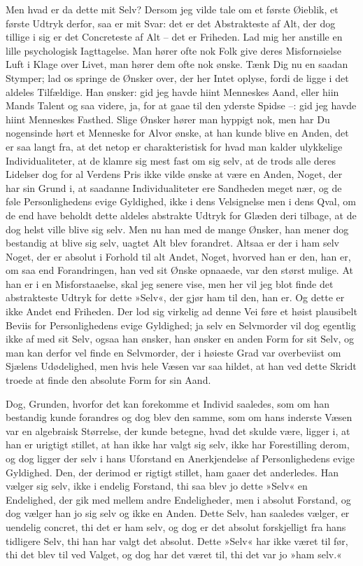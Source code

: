 \documentclass[12pt,a4paper]{article}
\begin{document}
Men hvad er da dette mit Selv? Dersom jeg vilde tale om et første Øieblik, et første Udtryk derfor, saa er mit Svar: det er det Abstrakteste af Alt, der dog tillige i sig er det Concreteste af Alt – det er Friheden. Lad mig her anstille en lille psychologisk Iagttagelse. Man hører ofte nok Folk give deres Misfornøielse Luft i Klage over Livet, man hører dem ofte nok ønske. Tænk Dig nu en saadan Stymper; lad os springe de Ønsker over, der her Intet oplyse, fordi de ligge i det aldeles Tilfældige. Han ønsker: gid jeg havde hiint Menneskes Aand, eller hiin Mands Talent og saa videre, ja, for at gaae til den yderste Spidse –: gid jeg havde hiint Menneskes Fasthed. Slige Ønsker hører man hyppigt nok, men har Du nogensinde hørt et Menneske for Alvor ønske, at han kunde blive en Anden, det er saa langt fra, at det netop er charakteristisk for hvad man kalder ulykkelige Individualiteter, at de klamre sig mest fast om sig selv, at de trods alle deres Lidelser dog for al Verdens Pris ikke vilde ønske at være en Anden, Noget, der har sin Grund i, at saadanne Individualiteter ere Sandheden meget nær, og de føle Personlighedens evige Gyldighed, ikke i dens Velsignelse men i dens Qval, om de end have beholdt dette aldeles abstrakte Udtryk for Glæden deri tilbage, at de dog helst ville blive sig selv. Men nu han med de mange Ønsker, han mener dog bestandig at blive sig selv, uagtet Alt blev forandret. Altsaa er der i ham selv Noget, der er absolut i Forhold til alt Andet, Noget, hvorved han er den, han er, om saa end Forandringen, han ved sit Ønske opnaaede, var den størst mulige. At han er i en Misforstaaelse, skal jeg senere vise, men her vil jeg blot finde det abstrakteste Udtryk for dette »Selv«, der gjør ham til den, han er. Og dette er ikke Andet end Friheden. Der lod sig virkelig ad denne Vei føre et høist plausibelt Beviis for Personlighedens evige Gyldighed; ja selv en Selvmorder vil dog egentlig ikke af med sit Selv, ogsaa han ønsker, han ønsker en anden Form for sit Selv, og man kan derfor vel finde en Selvmorder, der i høieste Grad var overbeviist om Sjælens Udødelighed, men hvis hele Væsen var saa hildet, at han ved dette Skridt troede at finde den absolute Form for sin Aand.

Dog, Grunden, hvorfor det kan forekomme et Individ saaledes, som om han bestandig kunde forandres og dog blev den samme, som om hans inderste Væsen var en algebraisk Størrelse, der kunde betegne, hvad det skulde være, ligger i, at han er urigtigt stillet, at han ikke har valgt sig selv, ikke har Forestilling derom, og dog ligger der selv i hans Uforstand en Anerkjendelse af Personlighedens evige Gyldighed. Den, der derimod er rigtigt stillet, ham gaaer det anderledes. Han vælger sig selv, ikke i endelig Forstand, thi saa blev jo dette »Selv« en Endelighed, der gik med mellem andre Endeligheder, men i absolut Forstand, og dog vælger han jo sig selv og ikke en Anden. Dette Selv, han saaledes vælger, er uendelig concret, thi det er ham selv, og dog er det absolut forskjelligt fra hans tidligere Selv, thi han har valgt det absolut. Dette »Selv« har ikke været til før, thi det blev til ved Valget, og dog har det været til, thi det var jo »ham selv.«
\end{document}
